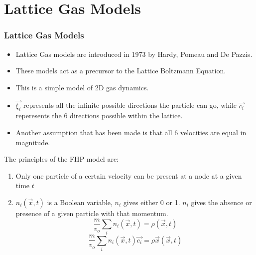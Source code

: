 \documentclass{beamer}
\begin{document}
\section{Lattice Gas Models}
\begin{frame}
	\frametitle{Lattice Gas Models}
	\begin{itemize}
		\item Lattice Gas models are introduced in 1973 by Hardy, Pomeau and De Pazzis. \item These models act as a precursor to the Lattice Boltzmann Equation. \item This is a simple model of 2D gas dynamics.

	\end{itemize}
\end{frame}
\begin{frame}
	\begin{itemize}
	\item<1-> $\vec{\xi_i}$ represents all the infinite possible directions the particle can go, while $\vec{c_i}$ reperesents the 6 directions possible within the lattice.
	\item<2-> Another assumption that has been made is that all 6 velocities are equal in magnitude.
\end{itemize}
\end{frame}
\begin{frame}
	The principles of the FHP model are:
\begin{enumerate}
	\item Only one particle of a certain velocity can be present at a node at a given time $t$
	\item $n_i(\vec{x}, t)$ is a Boolean variable, $n_i$ gives either 0 or 1. $n_i$ gives the absence or presence of a given particle with that momentum.
		\[
			\frac{m}{v_o} \sum_i n_i (\vec{x},t) = \rho(\vec{x},t)
		\]
		\[
			\frac{m}{v_o} \sum_i n_i (\vec{x},t) \vec{c_i} = \rho \vec{x}(\vec{x},t)
		\]
\end{enumerate}
\end{frame}
\end{document}
